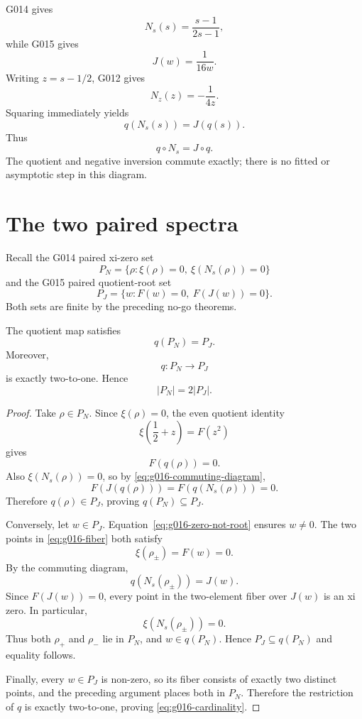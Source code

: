 G014 gives
\[
 N_s(s)=\frac{s-1}{2s-1},
\]
while G015 gives
\[
 J(w)=\frac1{16w}.
\]
Writing $z=s-1/2$, G012 gives
\[
 N_z(z)=-\frac1{4z}.
\]
Squaring immediately yields
\begin{equation}
 \boxed{
 q(N_s(s))=J(q(s)).
 }
 \label{eq:g016-commuting-diagram}
\end{equation}
Thus
\[
 \boxed{q\circ N_s=J\circ q.}
\]
The quotient and negative inversion commute exactly; there is no fitted or
asymptotic step in this diagram.

\section{The two paired spectra}

Recall the G014 paired xi-zero set
\begin{equation}
 P_N
 =\{\rho:\xi(\rho)=0,\ \xi(N_s(\rho))=0\}
 \label{eq:g016-PN}
\end{equation}
and the G015 paired quotient-root set
\begin{equation}
 P_J
 =\{w:F(w)=0,\ F(J(w))=0\}.
 \label{eq:g016-PJ}
\end{equation}
Both sets are finite by the preceding no-go theorems.

\begin{theorem}
\label{thm:g016-paired-quotient}
The quotient map satisfies
\begin{equation}
 \boxed{q(P_N)=P_J.}
 \label{eq:g016-image-equality}
\end{equation}
Moreover,
\[
 q:P_N\longrightarrow P_J
\]
is exactly two-to-one.  Hence
\begin{equation}
 \boxed{|P_N|=2|P_J|.}
 \label{eq:g016-cardinality}
\end{equation}
\end{theorem}

\begin{proof}
Take $\rho\in P_N$.  Since $\xi(\rho)=0$, the even quotient identity
\[
 \xi\!\left(\frac12+z\right)=F(z^2)
\]
gives
\[
 F(q(\rho))=0.
\]
Also $\xi(N_s(\rho))=0$, so by
\cref{eq:g016-commuting-diagram},
\[
 F(J(q(\rho)))
 =F(q(N_s(\rho)))
 =0.
\]
Therefore $q(\rho)\in P_J$, proving $q(P_N)\subseteq P_J$.

Conversely, let $w\in P_J$.  Equation~\eqref{eq:g016-zero-not-root} ensures
$w\ne0$.  The two points in \cref{eq:g016-fiber} both satisfy
\[
 \xi(\rho_\pm)=F(w)=0.
\]
By the commuting diagram,
\[
 q(N_s(\rho_\pm))=J(w).
\]
Since $F(J(w))=0$, every point in the two-element fiber over $J(w)$ is an xi
zero.  In particular,
\[
 \xi(N_s(\rho_\pm))=0.
\]
Thus both $\rho_+$ and $\rho_-$ lie in $P_N$, and $w\in q(P_N)$.  Hence
$P_J\subseteq q(P_N)$ and equality follows.

Finally, every $w\in P_J$ is non-zero, so its fiber consists of exactly two
distinct points, and the preceding argument places both in $P_N$.  Therefore
the restriction of $q$ is exactly two-to-one, proving
\cref{eq:g016-cardinality}.
\end{proof}

